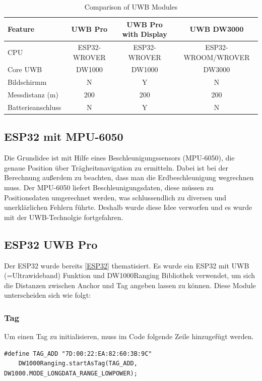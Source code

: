 \begin{table}[h]
	\centering
	\small
	\begin{tabular}{|l|c|c|c|}
		\hline
		\textbf{Feature} & \textbf{UWB Pro} & \textbf{UWB Pro with Display} & \textbf{UWB DW3000} \\
		\hline
		CPU & ESP32-WROVER & ESP32-WROVER & ESP32-WROOM/WROVER \\
		\hline
		Core UWB & DW1000 & DW1000 & DW3000 \\
		\hline
		Bildschirmm & N & Y & N \\
		\hline
		Messdistanz (m) & 200 & 200 & 200 \\
		\hline
		Batterieanschluss & N & Y & N \\
		\hline
	\end{tabular}
	\caption{Comparison of UWB Modules}
	\label{tab:uwb_comparison}
\end{table}

\subsection{ESP32 mit MPU-6050}
Die Grundidee ist mit Hilfe eines Beschleunigungssensors (MPU-6050), die genaue Position über Trägheitsnavigation zu ermitteln. Dabei ist bei der Berechnung außerdem zu beachten, dass man die Erdbeschleunigung wegrechnen muss. Der MPU-6050 liefert Beschleunigungsdaten, diese müssen zu Positionsdaten umgerechnet werden, was schlussendlich zu diversen und unerklärlichen Fehlern führte. Deshalb wurde diese Idee verworfen und es wurde mit der UWB-Technolgie fortgefahren. \parencite{MPU6050}

\subsection{ESP32 UWB Pro}

Der ESP32 wurde bereits \ref{ESP32} thematisiert. Es wurde ein ESP32 mit UWB (=Ultrawideband) Funktion und DW1000Ranging Bibliothek verwendet, um sich die Distanzen zwischen Anchor und Tag angeben lassen zu können. Diese Module unterscheiden sich wie folgt:

\subsubsection{Tag}

Um einen Tag zu initialisieren, muss im Code folgende Zeile hinzugefügt werden.
\begin{lstlisting}[style=C++, caption=Tag Initialisierung, captionpos=b]
	#define TAG_ADD "7D:00:22:EA:82:60:3B:9C"
	DW1000Ranging.startAsTag(TAG_ADD, DW1000.MODE_LONGDATA_RANGE_LOWPOWER);
\end{lstlisting}  

